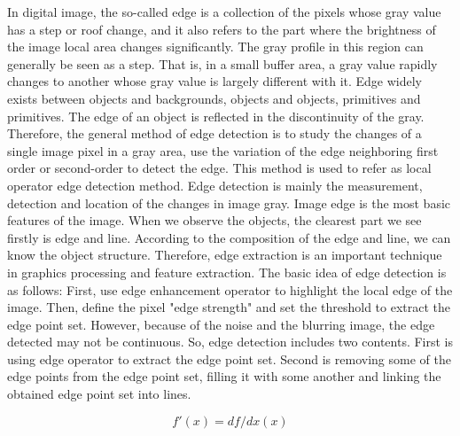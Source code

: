 \documentclass[BTech]{srmuthesis}
\begin{document}
In digital image, the so-called edge is a collection of the pixels whose gray value has a step or roof change, and it also refers to the part where the brightness of the image local area changes significantly. The gray profile in this region can generally be seen as a step. That is, in a small buffer area, a gray value rapidly changes to another whose gray value is largely different with it. Edge widely exists between objects and  backgrounds, objects and objects, primitives and primitives. The edge of an object is reflected in the discontinuity of the gray. Therefore, the general method of edge detection is to study the changes of a single image pixel in a gray area, use the variation of the edge neighboring first order or second-order to detect the edge. This method is used to refer as local operator edge detection method. Edge detection is mainly the measurement, detection and location of the changes in image gray. Image edge is the most basic features of the image. When we observe the objects, the clearest part we see firstly is edge and line. According to the composition of the edge and line, we can know the object structure. Therefore, edge extraction is an important technique in graphics processing and feature extraction. The basic idea of edge detection is as follows: First, use edge enhancement operator to highlight the local edge of the image. Then, define the pixel "edge strength" and set the threshold to extract the edge point set. However, because of the noise and the blurring image, the edge detected may not be continuous. So, edge detection includes two contents. 
First is using edge operator to extract the edge point set. Second is removing some of the edge points from the edge point set, filling it with some another and linking the obtained edge point set into lines. 

\begin{equation}
f'(x)=df/dx(x) 
\label{eq:mkceqn}
\end{equation} 
\end{document}
